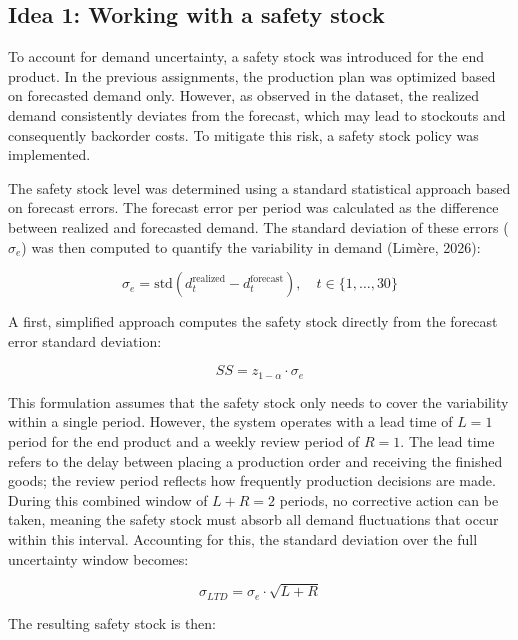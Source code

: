\documentclass[a4paper,faculty=eb,language=en,doctype=article,sftitles=false]{ugent-doc}
\begin{document}
\subsection*{Idea 1: Working with a safety stock}

To account for demand uncertainty, a safety stock was introduced for the end product. In the previous assignments, the production plan was optimized based on forecasted demand only. However, as observed in the dataset, the realized demand consistently deviates from the forecast, which may lead to stockouts and consequently backorder costs. To mitigate this risk, a safety stock policy was implemented.

The safety stock level was determined using a standard statistical approach based on forecast errors. The forecast error per period was calculated as the difference between realized and forecasted demand. The standard deviation of these errors ($\sigma_e$) was then computed to quantify the variability in demand  (Lim\`{e}re, 2026):

\begin{equation}
    \sigma_e = \text{std}(d_t^{\text{realized}} - d_t^{\text{forecast}}), \quad t \in \{1, \dots, 30\}
\end{equation}

A first, simplified approach computes the safety stock directly from the forecast error standard deviation:

\begin{equation}
    SS = z_{1-\alpha} \cdot \sigma_e
\end{equation}

This formulation assumes that the safety stock only needs to cover the variability within a single period. However, the system operates with a lead time of $L = 1$ period for the end product and a weekly review period of $R = 1$. The lead time refers to the delay between placing a production order and receiving the finished goods; the review period reflects how frequently production decisions are made. During this combined window of $L + R = 2$ periods, no corrective action can be taken, meaning the safety stock must absorb all demand fluctuations that occur within this interval. Accounting for this, the standard deviation over the full uncertainty window becomes:

\begin{equation}
    \sigma_{LTD} = \sigma_e \cdot \sqrt{L + R}
\end{equation}

The resulting safety stock is then:
\end{document}
